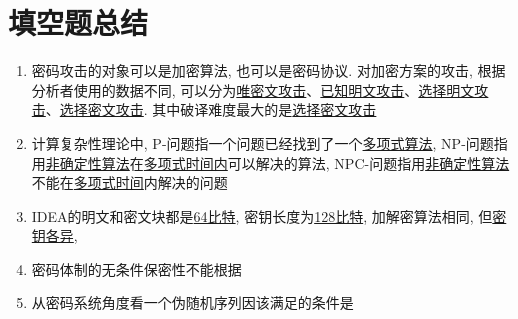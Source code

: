 \documentclass[UTF8]{ctexart}
\begin{document}
\section{填空题总结}
\begin{enumerate}
  \item 密码攻击的对象可以是加密算法, 也可以是密码协议. 对加密方案的攻击, 根据分析者使用的数据不同, 可以分为\underline{唯密文攻击}、\underline{已知明文攻击}、\underline{选择明文攻击}、\underline{选择密文攻击}. 其中破译难度最大的是\underline{选择密文攻击}
  \item 计算复杂性理论中, P-问题指一个问题已经找到了一个\underline{多项式算法}, NP-问题指用\underline{非确定性算法}在\underline{多项式时间内}可以解决的算法, NPC-问题指用\underline{非确定性算法}不能在\underline{多项式时间}内解决的问题
  \item IDEA的明文和密文块都是\underline{64比特}, 密钥长度为\underline{128比特}, 加解密算法相同, 但\underline{密钥各异},
  \item 密码体制的无条件保密性不能根据
  \item 从密码系统角度看一个伪随机序列因该满足的条件是

\end{enumerate}
\end{document}
